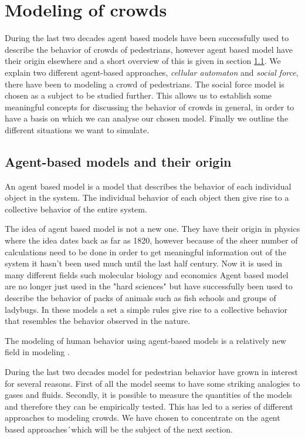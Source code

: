 \section{Modeling of crowds}
\label{sec:crowds}
During the last two decades agent based models have been successfully  used to 
describe the behavior of crowds of pedestrians, however agent based model have their 
origin elsewhere and a short overview of this is given in section \ref{subsec:ABM}. We explain 
two different agent-based approaches, \emph{cellular automaton} and \emph{social force}, 
there have been to modeling a crowd of pedestrians. The social force model is chosen 
as a subject to be studied further. This allows us to establish some meaningful concepts 
for discussing the behavior of crowds in general, in order to have a basis on which 
we can analyse our chosen model. Finally we outline the different situations we 
want to simulate.

\subsection{Agent-based models and their origin}\label{subsec:ABM}
An agent based model is a model that describes the behavior of each individual 
object in the system. The individual behavior of each object then give rise to 
a collective behavior of the entire system.

The idea of agent based model is not a new one. They have their origin in physics 
where the idea dates back as far as 1820, however because of the sheer number of 
calculations need to be done in order to get meaningful information out of 
the system it hasn't been used much until the last half century\cite{simintro}. Now it is 
used in many different fields such molecular biology and economics\cite{MDbio} Agent based 
model are no longer just used in the "hard sciences" but have successfully been 
used to describe the behavior of packs of animals such as fish schools and 
groups of ladybugs. In these models a set a simple rules give rise to a collective 
behavior that resembles the behavior observed in the nature. 

The modeling of human behavior using agent-based models is a 
relatively new field in modeling \cite{helbing00}. 

During the last two decades model for pedestrian behavior have grown in 
interest for several reasons. First of all the model seems to have some 
striking analogies to gases and fluids. Secondly, it is possible to measure 
the quantities of the models and therefore they can be empirically tested. 
This has led to a series of different approaches to modeling crowds. We have 
chosen to concentrate on the agent based approaches´which will be the subject 
of the next section.

